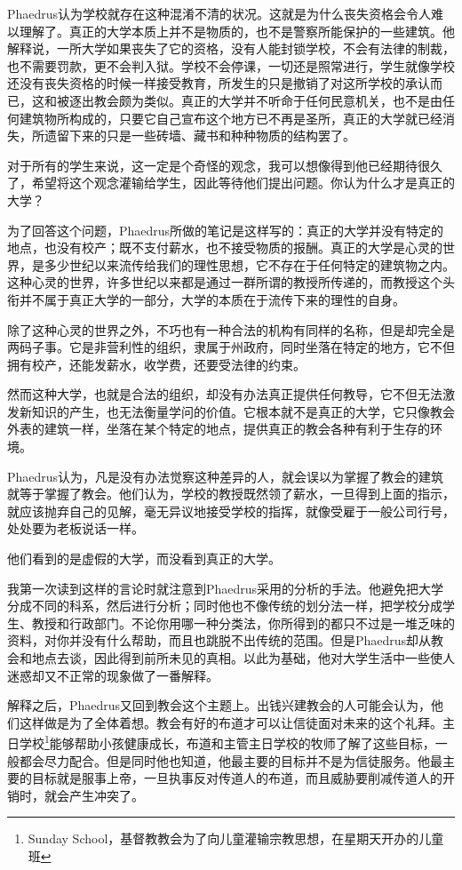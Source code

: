 \documentclass[UTF8]{article}
\begin{document}
\par Phaedrus认为学校就存在这种混淆不清的状况。这就是为什么丧失资格会令人难以理解了。真正的大学本质上并不是物质的，也不是警察所能保护的一些建筑。他解释说，一所大学如果丧失了它的资格，没有人能封锁学校，不会有法律的制裁，也不需要罚款，更不会判入狱。学校不会停课，一切还是照常进行，学生就像学校还没有丧失资格的时候一样接受教育，所发生的只是撤销了对这所学校的承认而已，这和被逐出教会颇为类似。真正的大学并不听命于任何民意机关，也不是由任何建筑物所构成的，只要它自己宣布这个地方已不再是圣所，真正的大学就已经消失，所遗留下来的只是一些砖墙、藏书和种种物质的结构罢了。
\par 对于所有的学生来说，这一定是个奇怪的观念，我可以想像得到他已经期待很久了，希望将这个观念灌输给学生，因此等待他们提出问题。你认为什么才是真正的大学？
\par 为了回答这个问题，Phaedrus所做的笔记是这样写的：真正的大学并没有特定的地点，也没有校产；既不支付薪水，也不接受物质的报酬。真正的大学是心灵的世界，是多少世纪以来流传给我们的理性思想，它不存在于任何特定的建筑物之内。这种心灵的世界，许多世纪以来都是通过一群所谓的教授所传递的，而教授这个头衔并不属于真正大学的一部分，大学的本质在于流传下来的理性的自身。
\par 除了这种心灵的世界之外，不巧也有一种合法的机构有同样的名称，但是却完全是两码子事。它是非营利性的组织，隶属于州政府，同时坐落在特定的地方，它不但拥有校产，还能发薪水，收学费，还要受法律的约束。
\par 然而这种大学，也就是合法的组织，却没有办法真正提供任何教导，它不但无法激发新知识的产生，也无法衡量学问的价值。它根本就不是真正的大学，它只像教会外表的建筑一样，坐落在某个特定的地点，提供真正的教会各种有利于生存的环境。
\par Phaedrus认为，凡是没有办法觉察这种差异的人，就会误以为掌握了教会的建筑就等于掌握了教会。他们认为，学校的教授既然领了薪水，一旦得到上面的指示，就应该抛弃自己的见解，毫无异议地接受学校的指挥，就像受雇于一般公司行号，处处要为老板说话一样。
\par 他们看到的是虚假的大学，而没看到真正的大学。
\par 我第一次读到这样的言论时就注意到Phaedrus采用的分析的手法。他避免把大学分成不同的科系，然后进行分析；同时他也不像传统的划分法一样，把学校分成学生、教授和行政部门。不论你用哪一种分类法，你所得到的都只不过是一堆乏味的资料，对你并没有什么帮助，而且也跳脱不出传统的范围。但是Phaedrus却从教会和地点去谈，因此得到前所未见的真相。以此为基础，他对大学生活中一些使人迷惑却又不正常的现象做了一番解释。
\par 解释之后，Phaedrus又回到教会这个主题上。出钱兴建教会的人可能会认为，他们这样做是为了全体着想。教会有好的布道才可以让信徒面对未来的这个礼拜。主日学校\footnote{Sunday School，基督教教会为了向儿童灌输宗教思想，在星期天开办的儿童班}能够帮助小孩健康成长，布道和主管主日学校的牧师了解了这些目标，一般都会尽力配合。但是同时他也知道，他最主要的目标并不是为信徒服务。他最主要的目标就是服事上帝，一旦执事反对传道人的布道，而且威胁要削减传道人的开销时，就会产生冲突了。
\end{document}
